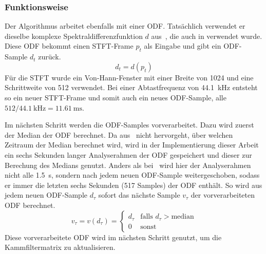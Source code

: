 {{		\subsubsection*{Funktionsweise}
		{
			Der Algorithmus arbeitet ebenfalls mit einer \ac{ODF}.
			Tatsächlich verwendet er dieselbe komplexe Spektraldifferenzfunktion $d$ aus~\cite{2004_BeDaDuSa},
				die auch in \cite{2009_DaPlSt} verwendet wurde.
			Diese ODF bekommt einen \acs{STFT}-Frame $p_t$ als Eingabe und gibt ein ODF-Sample $d_t$ zurück.
			\begin{equation}
				d_t = d(p_t)
			\end{equation}
			Für die \ac{STFT} wurde ein Von-Hann-Fenster mit einer Breite von \num{1024} und eine Schrittweite von \num{512} verwendet.
			Bei einer Abtastfrequenz von \SI{44.1}{\kilo\hertz} entsteht so ein neuer \acs{STFT}-Frame
				und somit auch ein neues ODF-Sample,
				alle $512 / \SI{44.1}{\kilo\hertz} = \SI{11.61}{\milli\second}$.

			Im nächsten Schritt werden die ODF-Samples vorverarbeitet.
			Dazu wird zuerst der Median der \ac{ODF} berechnet.
			Da aus~\cite{2011_PlRoSt} nicht hervorgeht,
				über welchen Zeitraum der Median berechnet wird,
				wird in der Implementierung dieser Arbeit
				ein sechs Sekunden langer Analyserahmen der \ac{ODF} gespeichert
				und dieser zur Berechung des Medians genutzt.
			Anders als bei~\cite{2009_DaPlSt} wird hier der Analyserahmen nicht alle \SI{1.5}{\second},
				sondern nach jedem neuen ODF-Sample weitergeschoben,
				sodass er immer die letzten sechs Sekunden (\num{517} Samples) der \ac{ODF} enthält.
			So wird aus jedem neuen ODF-Sample $d_\tau$ sofort das nächste Sample $v_\tau$ der vorverarbeiteten ODF berechnet.
			\begin{equation}
				v_\tau = v(d_\tau) =
				\begin{cases}
					d_\tau & \text{falls } d_\tau > \text{median} \\
					0    & \text{sonst}
				\end{cases}
			\end{equation}
			Diese vorverarbeitete \ac{ODF} wird im nächsten Schritt genutzt,
				um die Kammfiltermatrix zu aktualisieren.

}}}

